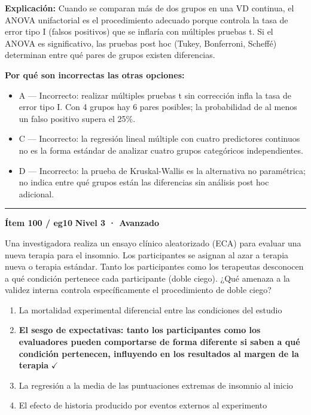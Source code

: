 \documentclass[12pt,a4paper]{article}
\begin{document}
\noindent\textbf{\color{azul}Explicación:} Cuando se comparan más de dos grupos en una VD continua, el ANOVA unifactorial es el procedimiento adecuado porque controla la tasa de error tipo I (falsos positivos) que se inflaría con múltiples pruebas t. Si el ANOVA es significativo, las pruebas post hoc (Tukey, Bonferroni, Scheffé) determinan entre qué pares de grupos existen diferencias.

\noindent\textbf{\color{gris}Por qué son incorrectas las otras opciones:}
\begin{itemize}
  \item {\small A — Incorrecto: realizar múltiples pruebas t sin corrección infla la tasa de error tipo I. Con 4 grupos hay 6 pares posibles; la probabilidad de al menos un falso positivo supera el 25\%.}
  \item {\small C — Incorrecto: la regresión lineal múltiple con cuatro predictores continuos no es la forma estándar de analizar cuatro grupos categóricos independientes.}
  \item {\small D — Incorrecto: la prueba de Kruskal-Wallis es la alternativa no paramétrica; no indica entre qué grupos están las diferencias sin análisis post hoc adicional.}
\end{itemize}
\vspace{8pt}\hrule\vspace{10pt}

\begin{mdframed}[backgroundcolor=fondogris,linecolor=rojo,linewidth=1pt,innerleftmargin=10pt,innerrightmargin=10pt,innertopmargin=7pt,innerbottommargin=7pt]
\textbf{Ítem 100 / eg10} \hfill {\small\bfseries\color{rojo} Nivel 3 · Avanzado}
\end{mdframed}

Una investigadora realiza un ensayo clínico aleatorizado (ECA) para evaluar una nueva terapia para el insomnio. Los participantes se asignan al azar a terapia nueva o terapia estándar. Tanto los participantes como los terapeutas desconocen a qué condición pertenece cada participante (doble ciego). ¿Qué amenaza a la validez interna controla específicamente el procedimiento de doble ciego?

\begin{enumerate}
  \item[A.] La mortalidad experimental diferencial entre las condiciones del estudio
  \item[\textbf{\color{verde}B.}] \textbf{\color{verde} El sesgo de expectativas: tanto los participantes como los evaluadores pueden comportarse de forma diferente si saben a qué condición pertenecen, influyendo en los resultados al margen de la terapia} \hfill $\checkmark$
  \item[C.] La regresión a la media de las puntuaciones extremas de insomnio al inicio
  \item[D.] El efecto de historia producido por eventos externos al experimento
\end{enumerate}
\end{document}
